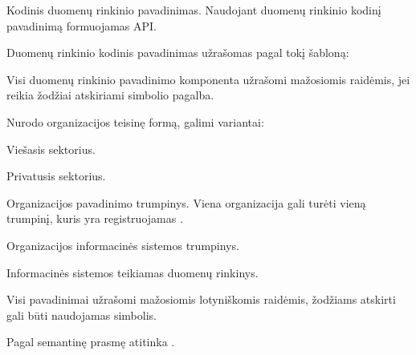 \documentclass[letterpaper,10pt,lithuanian]{sphinxmanual}
\begin{document}
\begin{fulllineitems}
\label{\detokenize{formatas:dataset}}
\pysigstartsignatures
\pysigline
{}
\pysigstopsignatures
\sphinxAtStartPar
{}

\sphinxAtStartPar
Kodinis duomenų rinkinio pavadinimas. Naudojant duomenų rinkinio kodinį
pavadinimą formuojamas API.

\sphinxAtStartPar
Duomenų rinkinio kodinis pavadinimas užrašomas pagal tokį šabloną:

\sphinxAtStartPar
{}  \sphinxcode{\sphinxupquote{/}}  \sphinxcode{\sphinxupquote{/}}  \sphinxcode{\sphinxupquote{/}} 

\sphinxAtStartPar
Visi duomenų rinkinio pavadinimo komponenta užrašomi mažosiomis raidėmis,
jei reikia žodžiai atskiriami \sphinxcode{\sphinxupquote{\_}} simbolio pagalba.
\begin{description}
\sphinxAtStartPar
Nurodo organizacijos teisinę formą, galimi variantai:

\begin{DUlineblock}{0em}
\item[]  \sphinxhyphen{} Viešasis sektorius.
\item[]  \sphinxhyphen{} Privatusis sektorius.
\end{DUlineblock}

\sphinxAtStartPar
Organizacijos pavadinimo trumpinys. Viena organizacija gali turėti
vieną trumpinį, kuris yra registruojamas {\hyperref[\detokenize{savokos:term-duomenu-katalogas}]{}}.

\sphinxAtStartPar
Organizacijos informacinės sistemos trumpinys.

\sphinxAtStartPar
Informacinės sistemos teikiamas duomenų rinkinys.

\end{description}

\sphinxAtStartPar
Visi pavadinimai užrašomi mažosiomis lotyniškomis raidėmis, žodžiams
atskirti gali būti naudojamas \sphinxcode{\sphinxupquote{\_}} simbolis.

\sphinxAtStartPar
Pagal semantinę prasmę atitinka .


\end{fulllineitems}
\end{document}
